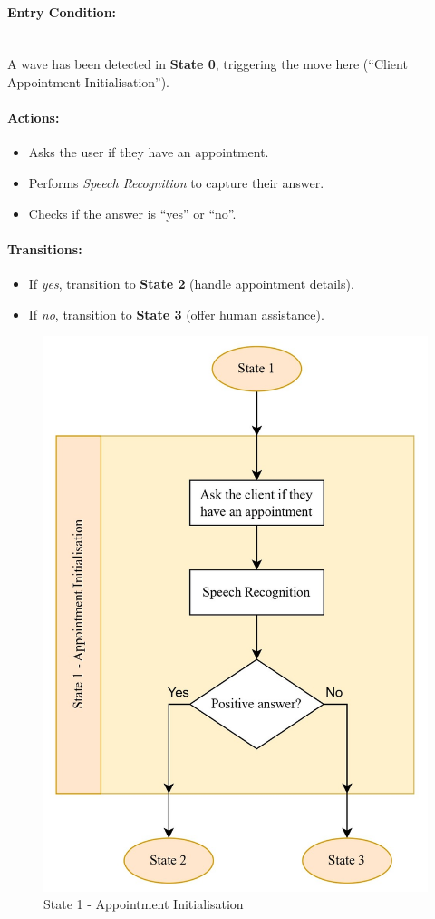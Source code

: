 \documentclass[conference]{IEEEtran}
\begin{document}
\paragraph{Entry Condition:}
\mbox{}\\
A wave has been detected in \textbf{State 0}, triggering the move here (``Client Appointment Initialisation'').

\paragraph{Actions:}
\begin{itemize}
  \item Asks the user if they have an appointment.
  \item Performs \emph{Speech Recognition} to capture their answer.
  \item Checks if the answer is ``yes'' or ``no''.
\end{itemize}

\paragraph{Transitions:}
\begin{itemize}
  \item If \emph{yes}, transition to \textbf{State 2} (handle appointment details).
  \item If \emph{no}, transition to \textbf{State 3} (offer human assistance).
\end{itemize}

\begin{figure}
    \centering
    \includegraphics[width=.6\linewidth]{State 1 - Appointment Initialisation.jpg}
    \caption{State 1 - Appointment Initialisation}
    \label{State 1 - Appointment Initialisation}
\end{figure}
\end{document}
